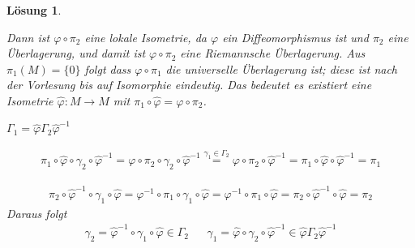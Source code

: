 \documentclass[paper=A4, twoside, chapterprefix=true, bibliography=totoc, headsepline]{scrbook}
\let\temp\phi{}
\let\phi\varphi{}
\let\varphi\temp{}
\let\temp\theta{}
\let\theta\vartheta{}
\let\vartheta\temp{}
\let\temp\epsilon{}
\let\epsilon\varepsilon{}
\let\varepsilon\temp{}
\let\temp\rho{}
\let\rho\varrho{}
\let\varrho\temp{}
\theoremstyle{plain}
\theoremstyle{nonumberplain}
\theoremstyle{empty}
\theoremstyle{break}
\newtheorem{Loes}{L\"osung}
\newcommand{\quot}[1]{\textrm{\glqq}{#1}\textrm{\grqq}}
\begin{document}
\begin{Loes}
\begin{description}[leftmargin=*]
{}
	Dann ist $\phi \circ \pi_2$ eine lokale Isometrie, da $\phi$ ein Diffeomorphismus ist und $\pi_2$ eine \"Uberlagerung, und damit ist $\phi \circ \pi_2$ eine Riemannsche \"Uberlagerung.
	Aus $\pi_1(M) = \{0\}$ folgt dass $\phi \circ \pi_1$ die universelle \"Uberlagerung ist; diese ist nach der Vorlesung bis auf Isomorphie eindeutig.
	Das bedeutet es existiert eine Isometrie $\hat\phi: M \to M$ mit $\pi_1 \circ \hat\phi = \phi \circ \pi_2$.
	\begin{description}[leftmargin=*,font=\normalfont\itshape]
	\item[Behauptung:] $\Gamma_1 = \hat\phi \Gamma_2 \hat\phi^{-1}$
	\item[Beweis:] \begin{description}[leftmargin=*,font=\normalfont]
		\item[\quot{$\subseteq$}:]
			\begin{align*}
				\pi_1 \circ \hat\phi \circ \gamma_2 \circ \hat\phi^{-1} = \phi \circ \pi_2 \circ \gamma_2 \circ \hat\phi^{-1} \overset{\gamma_1 \in \Gamma_2}{=} \phi \circ \pi_2 \circ \hat\phi^{-1} = \pi_1 \circ \hat\phi \circ \hat\phi^{-1} = \pi_1
			\end{align*}
		\item[\quot{$\supseteq$}:]
			\begin{align*}
				\pi_2 \circ \hat\phi^{-1} \circ \gamma_1 \circ \hat\phi = \phi^{-1} \circ \pi_1 \circ \gamma_1 \circ \hat\phi = \phi^{-1} \circ \pi_1 \circ \hat\phi = \pi_2 \circ \hat\phi^{-1} \circ \hat\phi = \pi_2
			\end{align*}
			Daraus folgt
			\begin{align*}
				\gamma_2 = \hat\phi^{-1} \circ \gamma_1 \circ \hat\phi \in \Gamma_2 && \gamma_1 = \hat\phi \circ \gamma_2 \circ \hat\phi^{-1} \in \hat\phi \Gamma_2 \hat\phi^{-1}
			\end{align*}
		\end{description}
	\end{description}
\end{description}\end{Loes}

\printindex

\printglossary[title=Glossar] %



\end{document}
